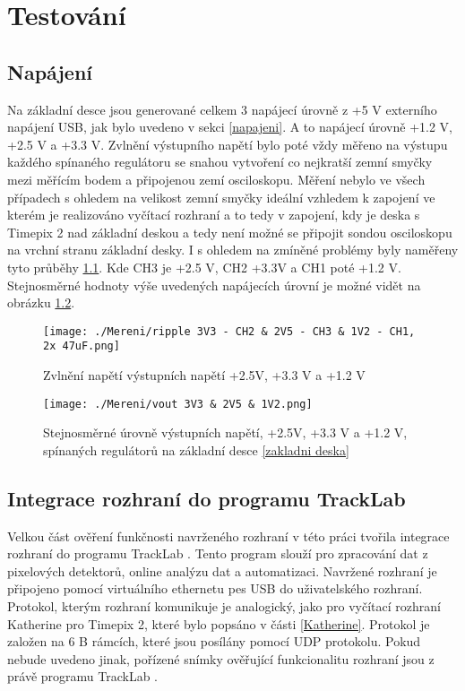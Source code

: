 \chapter{Testování}


\section{Napájení}
Na základní desce jsou generované celkem 3 napájecí úrovně z +5 V externího napájení USB, jak bylo uvedeno v sekci \ref{napajeni}. A to napájecí úrovně +1.2 V, +2.5 V a +3.3 V. Zvlnění výstupního napětí bylo poté vždy měřeno na výstupu každého spínaného regulátoru se snahou vytvoření co nejkratší zemní smyčky mezi měřícím bodem a připojenou zemí osciloskopu. Měření nebylo ve všech případech s ohledem na velikost zemní smyčky ideální vzhledem k zapojení ve kterém je realizováno vyčítací rozhraní a to tedy v zapojení, kdy je deska s Timepix 2 nad základní deskou a tedy není možné se připojit sondou osciloskopu na vrchní stranu základní desky. I s ohledem na zmíněné problémy byly naměřeny tyto průběhy \ref{fig:napeti}. Kde CH3 je +2.5 V, CH2 +3.3V a CH1 poté +1.2 V. Stejnosměrné hodnoty výše uvedených napájecích úrovní je možné vidět na obrázku \ref{fig:urovne}.
\begin{figure}[h!]
	\centering
	\captionsetup{justification=centering}
	\texttt{[image: ./Mereni/ripple 3V3 - CH2 \& 2V5 - CH3 \& 1V2 - CH1, 2x 47uF.png]}
	\caption{Zvlnění napětí výstupních napětí +2.5V, +3.3 V a +1.2 V } 
	\label{fig:napeti}
\end{figure}

\begin{figure}[h!]
	\centering
	\captionsetup{justification=centering}
	\texttt{[image: ./Mereni/vout 3V3 \& 2V5 \& 1V2.png]}
	\caption{Stejnosměrné úrovně výstupních napětí, +2.5V, +3.3 V a +1.2 V, spínaných regulátorů na základní desce \ref{zakladni deska}} 
	\label{fig:urovne}
\end{figure}

\section{Integrace rozhraní do programu TrackLab}
Velkou část ověření funkčnosti navrženého rozhraní v této práci tvořila integrace rozhraní do programu TrackLab \cite{Manek_2024}. Tento program slouží pro zpracování dat z pixelových detektorů, online analýzu dat a automatizaci. Navržené rozhraní je připojeno pomocí virtuálního ethernetu pes USB do uživatelského rozhraní. Protokol, kterým rozhraní komunikuje je analogický, jako pro vyčítací rozhraní Katherine pro Timepix 2, které bylo popsáno v části \ref{Katherine}. Protokol je založen na 6 B rámcích, které jsou posílány pomocí UDP protokolu. Pokud nebude uvedeno jinak, pořízené snímky ověřující funkcionalitu rozhraní jsou z právě programu TrackLab \cite{Manek_2024}.

